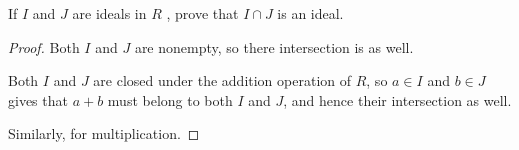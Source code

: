 \documentclass[../hw7]{subfiles}
\begin{document}
\begin{problem}
If $I$  and $J$  are ideals in $R$ , prove that $I\cap J$ is an ideal.
\end{problem}
\begin{proof}
	Both $I$ and  $J$ are nonempty, so there intersection is as well.

	Both  $I$ and  $J$ are closed under the addition operation of  $R$, so  $a\in I$ and $b\in J$ gives that $a+b$ must belong to both $I$ and $J$, and hence their intersection as well.

	Similarly, for multiplication.
\end{proof}
\end{document}
